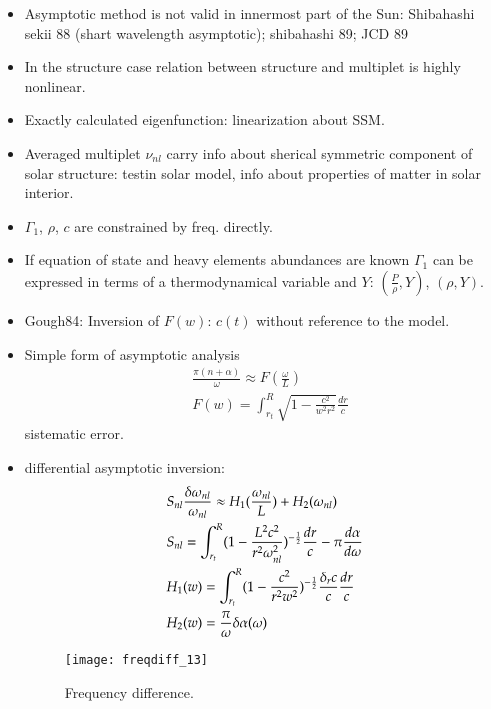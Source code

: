 \documentclass[../main.tex]{subfiles}
\begin{document}
\begin{itemize}
    \item Asymptotic method is not valid in innermost part of the Sun: Shibahashi sekii 88 (shart wavelength asymptotic); shibahashi 89; JCD 89 
    
    \item In the structure case relation between structure and multiplet is highly nonlinear.
    \item Exactly calculated eigenfunction: linearization about SSM.
    \item Averaged  multiplet $\nu_{nl}$ carry info about sherical symmetric component of solar structure: testin solar model, info about properties of matter in solar interior.
    \item $\Gamma_1$, $\rho$, $c$ are constrained by freq. directly.
    \item If equation of state and heavy elements abundances are known $\Gamma_1$ can be expressed in terms of a thermodynamical variable and $Y$: $(\frac{P}{\rho},Y)$, $(\rho,Y)$.
    
    \item Gough84:  Inversion of $F(w)$: $c(t)$ without reference to the model.
    
    \item Simple form of asymptotic analysis
    \begin{align*}
    &\frac{\pi(n+\alpha)}{\omega}\approx F(\frac{\omega}{L})\\
    &F(w)=\int_{r_t}^R\sqrt{1-\frac{c^2}{w^2r^2}}\frac{dr}{c}
    \end{align*}
    sistematic error.
    \item differential asymptotic inversion:
    \begin{align*}
    &S_{nl}\frac{\delta\omega_{nl}}{\omega_{nl}}\approx H_1(\frac{\omega_{nl}}{L})+H_2(\omega_{nl})\\
    &S_{nl}=\int_{r_t}^R(1-\frac{L^2c^2}{r^2\omega_{nl}^2})^{-\frac{1}{2}}\frac{dr}{c}-\pi\frac{d \alpha}{d \omega}\\
    &H_1(w)=\int_{r_t}^R(1-\frac{c^2}{r^2w^2})^{-\frac{1}{2}}\frac{\delta_rc}{c}\frac{dr}{c}\\
    &H_2(w)=\frac{\pi}{\omega}\delta\alpha(\omega)
    \end{align*}
    
    \begin{figure}[!ht]
    \centering
    \texttt{[image: freqdiff\_13]}
    \caption{Frequency difference.}
    \end{figure}


\end{itemize}
\end{document}

